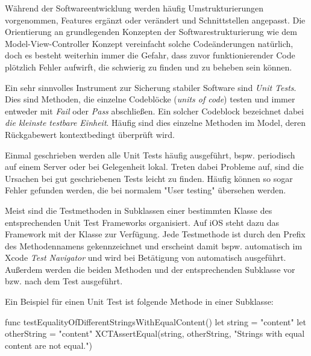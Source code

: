 \documentclass[parskip=half, final]{scrreprt}
\begin{document}
Während der Softwareentwicklung werden häufig Umstrukturierungen vorgenommen, Features ergänzt oder verändert und Schnittstellen angepasst. Die Orientierung an grundlegenden Konzepten der Softwarestrukturierung wie dem Model-View-Controller Konzept vereinfacht solche Codeänderungen natürlich, doch es besteht weiterhin immer die Gefahr, dass zuvor funktionierender Code plötzlich Fehler aufwirft, die schwierig zu finden und zu beheben sein können.

Ein sehr sinnvolles Instrument zur Sicherung stabiler Software sind \emph{Unit Tests}. Dies sind Methoden, die einzelne Codeblöcke (\emph{units of code}) testen und immer entweder mit \emph{Fail} oder \emph{Pass} abschließen. Ein solcher Codeblock bezeichnet dabei \emph{die kleinste testbare Einheit}. Häufig sind dies einzelne Methoden im Model, deren Rückgabewert kontextbedingt überprüft wird.

Einmal geschrieben werden alle Unit Tests häufig ausgeführt, bspw. periodisch auf einem Server oder bei Gelegenheit lokal. Treten dabei Probleme auf, sind die Ursachen bei gut geschriebenen Tests leicht zu finden. Häufig können so sogar Fehler gefunden werden, die bei normalem "{}User testing"{} übersehen werden.

Meist sind die Testmethoden in Subklassen einer bestimmten Klasse des entsprechenden Unit Test Frameworks organisiert. Auf iOS steht dazu das  Framework  mit der Klasse  zur Verfügung. Jede Testmethode ist durch den Prefix  des Methodennamens gekennzeichnet und erscheint damit bspw. automatisch im Xcode \emph{Test Navigator}  und wird bei Betätigung von  automatisch ausgeführt. Außerdem werden die beiden Methoden  und  der entsprechenden  Subklasse vor bzw. nach dem Test ausgeführt.

Ein Beispiel für einen Unit Test ist folgende Methode in einer  Subklasse:

\begin{swiftcode}
func testEqualityOfDifferentStringsWithEqualContent() {
    let string = "content"
    let otherString = "content"
    XCTAssertEqual(string, otherString, "Strings with equal content are not equal.")
}
\end{swiftcode}
\end{document}
